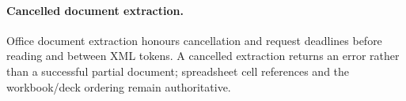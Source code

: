 \paragraph{Cancelled document extraction.}
Office document extraction honours cancellation and request deadlines before
reading and between XML tokens. A cancelled extraction returns an error rather
than a successful partial document; spreadsheet cell references and the
workbook/deck ordering remain authoritative.
